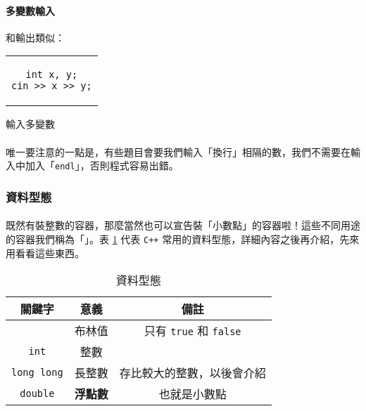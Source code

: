 \documentclass[12pt,a4paper,oneside]{article}
\begin{document}
\begin{CJK}{UTF8}{bkai}
\paragraph{多變數輸入}和輸出類似：

\begin{code}[h!]
\centering
\begin{tabular}{c}
\begin{lstlisting}
int x, y;
cin >> x >> y;
\end{lstlisting}
\end{tabular}
\caption{輸入多變數}
\label{basic:cpp:code:cin:variables}
\end{code}

\paragraph{}唯一要注意的一點是，有些題目會要我們輸入「換行」相隔的數，我們不需要在輸入中加入「\lstinline!endl!」，否則程式容易出錯。

\subsubsection{資料型態}

\paragraph{}既然有裝整數的容器，那麼當然也可以宣告裝「小數點」的容器啦！這些不同用途的容器我們稱為「」。表 \ref{basic:cpp:table:primitive:type} 代表 \texttt{C++} 常用的資料型態，詳細內容之後再介紹，先來用看看這些東西。

\begin{table}[h!]
\centering
\begin{tabular}{|c|c|c|}
\hline
關鍵字 & 意義 & 備註\\
\hline
\hline
\index{資料型態!布林值}{\lstinline!bool!} & 布林值 & 只有 \lstinline!true! 和 \lstinline!false!\\
\hline
\lstinline!int! & 整數 &\\
\hline
\lstinline!long long! & 長整數 & 存比較大的整數，以後會介紹\\
\hline
\lstinline!double!    & \textbf{浮點數} & 也就是小數點\\
\hline
\end{tabular}
\caption{資料型態}
\label{basic:cpp:table:primitive:type}
\end{table}


\end{CJK}
\end{document}

